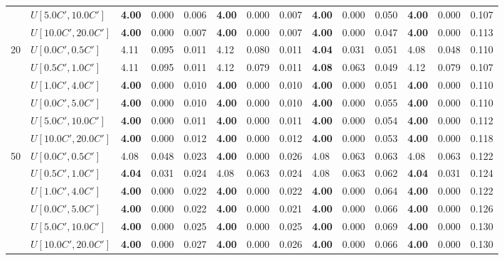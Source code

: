 \begin{table}[h]
{\begin{tabular}{|l|l||l|l|l||l|l|l||l|l|l||l|l|l|}
       & $U[5.0C',10.0C']$ & \textbf{4.00} & 0.000 & 0.006 & \textbf{4.00} & 0.000 & 0.007 & \textbf{4.00} & 0.000 & 0.050 & \textbf{4.00} & 0.000 & 0.107 \\
       & $U[10.0C',20.0C']$ & \textbf{4.00} & 0.000 & 0.007 & \textbf{4.00} & 0.000 & 0.007 & \textbf{4.00} & 0.000 & 0.047 & \textbf{4.00} & 0.000 & 0.113 \\
      \hline\hline
      \multirow{6}{*}{20} & $U[0.0C',0.5C']$ & 4.11 & 0.095 & 0.011 & 4.12 & 0.080 & 0.011 & \textbf{4.04} & 0.031 & 0.051 & 4.08 & 0.048 & 0.110 \\
       & $U[0.5C',1.0C']$ & 4.11 & 0.095 & 0.011 & 4.12 & 0.079 & 0.011 & \textbf{4.08} & 0.063 & 0.049 & 4.12 & 0.079 & 0.107 \\
       & $U[1.0C',4.0C']$ & \textbf{4.00} & 0.000 & 0.010 & \textbf{4.00} & 0.000 & 0.010 & \textbf{4.00} & 0.000 & 0.051 & \textbf{4.00} & 0.000 & 0.110 \\
       & $U[0.0C',5.0C']$ & \textbf{4.00} & 0.000 & 0.010 & \textbf{4.00} & 0.000 & 0.010 & \textbf{4.00} & 0.000 & 0.055 & \textbf{4.00} & 0.000 & 0.110 \\
       & $U[5.0C',10.0C']$ & \textbf{4.00} & 0.000 & 0.011 & \textbf{4.00} & 0.000 & 0.011 & \textbf{4.00} & 0.000 & 0.054 & \textbf{4.00} & 0.000 & 0.112 \\
       & $U[10.0C',20.0C']$ & \textbf{4.00} & 0.000 & 0.012 & \textbf{4.00} & 0.000 & 0.012 & \textbf{4.00} & 0.000 & 0.053 & \textbf{4.00} & 0.000 & 0.118 \\
      \hline\hline
      \multirow{6}{*}{50} & $U[0.0C',0.5C']$ & 4.08 & 0.048 & 0.023 & \textbf{4.00} & 0.000 & 0.026 & 4.08 & 0.063 & 0.063 & 4.08 & 0.063 & 0.122 \\
       & $U[0.5C',1.0C']$ & \textbf{4.04} & 0.031 & 0.024 & 4.08 & 0.063 & 0.024 & 4.08 & 0.063 & 0.062 & \textbf{4.04} & 0.031 & 0.124 \\
       & $U[1.0C',4.0C']$ & \textbf{4.00} & 0.000 & 0.022 & \textbf{4.00} & 0.000 & 0.022 & \textbf{4.00} & 0.000 & 0.064 & \textbf{4.00} & 0.000 & 0.122 \\
       & $U[0.0C',5.0C']$ & \textbf{4.00} & 0.000 & 0.022 & \textbf{4.00} & 0.000 & 0.021 & \textbf{4.00} & 0.000 & 0.066 & \textbf{4.00} & 0.000 & 0.126 \\
       & $U[5.0C',10.0C']$ & \textbf{4.00} & 0.000 & 0.025 & \textbf{4.00} & 0.000 & 0.025 & \textbf{4.00} & 0.000 & 0.069 & \textbf{4.00} & 0.000 & 0.130 \\
       & $U[10.0C',20.0C']$ & \textbf{4.00} & 0.000 & 0.027 & \textbf{4.00} & 0.000 & 0.026 & \textbf{4.00} & 0.000 & 0.066 & \textbf{4.00} & 0.000 & 0.130 \\
      \hline
      \end{tabular}
      }
      \label{tab:pcpn40}\end{table}


